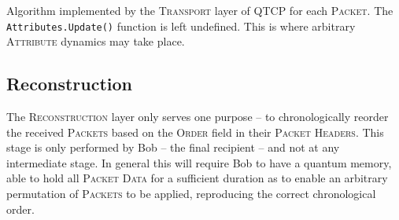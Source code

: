 \documentclass[aps,rmp,twocolumn,amsmath,amssymb,nofootinbib,superscriptaddress,longbibliography,floatfix,table-of-contents,eqsecnum]{revtex4-1}
\begin{document}
\begin{table}[!htb]
\caption{Algorithm implemented by the \textsc{Transport} layer of QTCP for each \textsc{Packet}. The \texttt{Attributes.Update()} function is left undefined. This is where arbitrary \textsc{Attribute} dynamics may take place.} \label{alg:transport_alg}
\end{table}

%
%

\subsection{Reconstruction} 

The \textsc{Reconstruction} layer only serves one purpose -- to chronologically reorder the received \textsc{Packets} based on the \textsc{Order} field in their \textsc{Packet Headers}. This stage is only performed by Bob -- the final recipient -- and not at any intermediate stage. In general this will require Bob to have a quantum memory, able to hold all \textsc{Packet Data} for a sufficient duration as to enable an arbitrary permutation of \textsc{Packets} to be applied, reproducing the correct chronological order.
\end{document}

